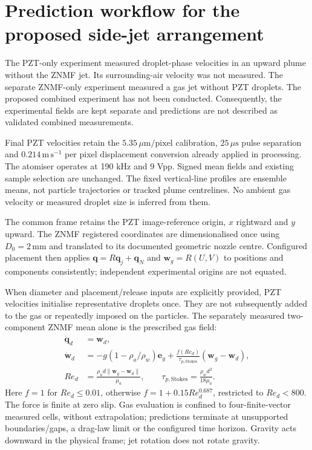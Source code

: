 \section{Prediction workflow for the proposed side-jet arrangement}
The PZT-only experiment measured droplet-phase velocities in an upward plume
without the ZNMF jet. Its surrounding-air velocity was not measured. The separate
ZNMF-only experiment measured a gas jet without PZT droplets. The proposed combined
experiment has not been conducted. Consequently, the experimental fields are
kept separate and predictions are not described as validated combined measurements.

Final PZT velocities retain the $5.35\,\mu\mathrm{m/pixel}$ calibration,
$25\,\mu\mathrm{s}$ pulse separation and $0.214\,\mathrm{m\,s^{-1}}$ per pixel
displacement conversion already applied in processing. The atomiser operates at
190 kHz and 9 Vpp. Signed mean fields and existing sample selection are unchanged.
The fixed vertical-line profiles are ensemble means, not particle trajectories
or tracked plume centrelines. No ambient gas velocity or measured droplet size
is inferred from them.

The common frame retains the PZT image-reference origin, $x$ rightward and $y$
upward. The ZNMF registered coordinates are dimensionalised once using $D_0=2\,$mm
and translated to its documented geometric nozzle centre. Configured placement
then applies $\boldsymbol q=R\boldsymbol q_j+\boldsymbol q_N$ and
$\boldsymbol w_g=R(U,V)$ to positions and components consistently; independent
experimental origins are not equated.

When diameter and placement/release inputs are explicitly provided, PZT velocities
initialise representative droplets once. They are not subsequently added to the
gas or repeatedly imposed on the particles. The separately measured two-component
ZNMF mean alone is the prescribed gas field:
\begin{align}
\dot{\boldsymbol q}_d&=\boldsymbol w_d,\\
\dot{\boldsymbol w}_d&=-g(1-\rho_a/\rho_w)\boldsymbol e_y+
\frac{f(Re_d)}{\tau_{p,\mathrm{Stokes}}}(\boldsymbol w_g-\boldsymbol w_d),\\
Re_d&=\frac{\rho_a d\lVert\boldsymbol w_g-\boldsymbol w_d\rVert}{\mu_a},
\qquad \tau_{p,\mathrm{Stokes}}=\frac{\rho_wd^2}{18\mu_a}.
\end{align}
Here $f=1$ for $Re_d\leq0.01$, otherwise $f=1+0.15Re_d^{0.687}$, restricted
to $Re_d<800$. The force is finite at zero slip. Gas evaluation is confined to
four-finite-vector measured cells, without extrapolation; predictions terminate
at unsupported boundaries/gaps, a drag-law limit or the configured time horizon.
Gravity acts downward in the physical frame; jet rotation does not rotate gravity.

